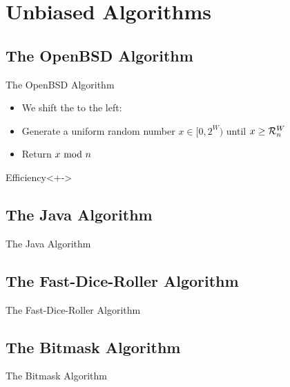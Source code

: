 \section{Unbiased Algorithms}

\subsection{The OpenBSD Algorithm}
\begin{frame}{The OpenBSD Algorithm}
    \pause 
    \begin{itemize}[<+->]
        \item We shift the  to the left:
        \item Generate a uniform random number $x \in [0,2^W)$ until $x \geq \mathcal{R}_n^W$
        \item Return $x \ \mathrm{mod}\ n$
    \end{itemize}

    \begin{block}{Efficiency}<+->
    \end{block}

\end{frame}



\subsection{The Java Algorithm}
\begin{frame}{The Java Algorithm}
    \pause 
    

\end{frame}



\subsection{The Fast-Dice-Roller Algorithm}
\begin{frame}{The Fast-Dice-Roller Algorithm}
    \pause 
    

\end{frame}



\subsection{The Bitmask Algorithm}
\begin{frame}{The Bitmask Algorithm}
    \pause 
    

\end{frame}